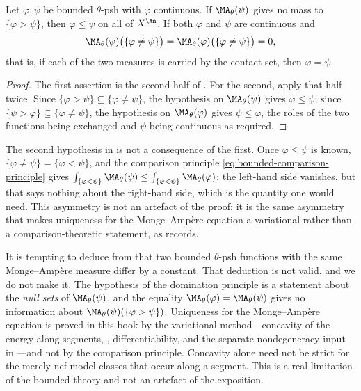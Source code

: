 \begin{corollary}
\label{cor:ch25-domination-uniqueness}
Let \(\varphi,\psi\) be bounded \(\theta\)-psh with \(\varphi\) continuous.
If \(\MA_\theta(\psi)\) gives no mass to \(\{\varphi>\psi\}\), then
\(\varphi\leq\psi\) on all of \(X^{\An}\).  If both \(\varphi\) and
\(\psi\) are continuous and
\[
 \MA_\theta(\psi)\bigl(\{\varphi\neq\psi\}\bigr)
 =\MA_\theta(\varphi)\bigl(\{\varphi\neq\psi\}\bigr)=0 ,
\]
that is, if each of the two measures is carried by the contact set, then
\(\varphi=\psi\).
\end{corollary}

\begin{proof}
The first assertion is the second half of
.  For the second, apply that half
twice.  Since \(\{\varphi>\psi\}\subseteq\{\varphi\neq\psi\}\), the
hypothesis on \(\MA_\theta(\psi)\) gives \(\varphi\leq\psi\); since
\(\{\psi>\varphi\}\subseteq\{\varphi\neq\psi\}\), the hypothesis on
\(\MA_\theta(\varphi)\) gives \(\psi\leq\varphi\), the roles of the two
functions being exchanged and \(\psi\) being continuous as required.
\end{proof}

\begin{remark}
\label{rem:ch25-both-carriers}
The second hypothesis in
 is not a consequence of the first.
Once \(\varphi\leq\psi\) is known, \(\{\varphi\neq\psi\}=\{\varphi<\psi\}\),
and the comparison principle \eqref{eq:bounded-comparison-principle} gives
\(\int_{\{\varphi<\psi\}}\MA_\theta(\psi)\leq
\int_{\{\varphi<\psi\}}\MA_\theta(\varphi)\); the left-hand side vanishes,
but that says nothing about the right-hand side, which is the quantity one
would need.  This asymmetry is not an artefact of the proof: it is the same
asymmetry that makes uniqueness for the Monge--Amp\`ere equation a
variational rather than a comparison-theoretic statement, as
 records.
\end{remark}

\begin{remark}
\label{rem:ch25-no-uniqueness}
It is tempting to deduce from
 that two bounded \(\theta\)-psh
functions with the same Monge--Amp\`ere measure differ by a constant.  That
deduction is not valid, and we do not make it.  The hypothesis of the
domination principle is a statement about the \emph{null sets} of
\(\MA_\theta(\psi)\), and the equality
\(\MA_\theta(\varphi)=\MA_\theta(\psi)\) gives no information about
\(\MA_\theta(\psi)(\{\varphi>\psi\})\).  Uniqueness for the
Monge--Amp\`ere equation is proved in this book by the variational
method---concavity of the energy along segments,
, differentiability, and the separate
nondegeneracy input in ---and not by the
comparison principle.  Concavity alone need not be strict for the merely
nef model classes that occur along a segment.
This is a real limitation of the bounded theory and not an artefact of the
exposition.
\end{remark}

